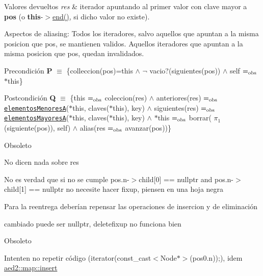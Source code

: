 \begin{DoxyRetVals}{Valores devueltos}
{\em res} & iterador apuntando al primer valor con clave mayor a {\bfseries pos} (o {\bfseries this}-\/$>$\hyperlink{classaed2_1_1map_a76023e6a56cb625513e1b5ea028bf983_a76023e6a56cb625513e1b5ea028bf983}{end()}, si dicho valor no existe).\\
\hline
\end{DoxyRetVals}
\begin{DoxyParagraph}{Aspectos de aliasing\+:}
Todos los iteradores, salvo aquellos que apuntan a la misma posicion que pos, se mantienen validos. Aquellos iteradores que apuntan a la misma posicion que pos, quedan invalidados.
\end{DoxyParagraph}
\begin{DoxyPrecond}{Precondición}
{\bfseries P} $\equiv$ \{colleccion(pos)=this $\land$ $\lnot$ vacio?(siguientes(pos)) $\land$ self $=_{\rm obs}$ $\ast$this\} 
\end{DoxyPrecond}
\begin{DoxyPostcond}{Postcondición}
{\bfseries Q} $\equiv$ \{this $=_{\rm obs}$ coleccion(res) $\land$ anteriores(res) $=_{\rm obs}$ \href{axiomas.html#elementosMenoresA}{\tt elementos\+MenoresA}($\ast$this, claves($\ast$this), key) $\land$ siguientes(res) $=_{\rm obs}$ \href{axiomas.html#elementosMayoresA}{\tt elementos\+MayoresA}($\ast$this, claves($\ast$this), key) $\land$ $\ast$this $=_{\rm obs}$ borrar( $\pi_1$(siguiente(pos)), self) $\land$ alias(res $=_{\rm obs}$ avanzar(pos))\}
\end{DoxyPostcond}
\begin{DoxyRefDesc}{Obsoleto}
\item[\hyperlink{deprecated__deprecated000016}{Obsoleto}]No dicen nada sobre res 

No es verdad que si no se cumple pos.\+n-\/$>$child\mbox{[}0\mbox{]} == nullptr and pos.\+n-\/$>$child\mbox{[}1\mbox{]} == nullptr no necesite hacer fixup, piensen en una hoja negra 

Para la reentrega deberían repensar las operaciones de insercion y de eliminación 

cambiado puede ser nullptr, deletefixup no funciona bien\end{DoxyRefDesc}


\begin{DoxyRefDesc}{Obsoleto}
\item[\hyperlink{deprecated__deprecated000017}{Obsoleto}]Intenten no repetir código (iterator(const\+\_\+cast$<$\+Node$\ast$$>$(pos0.\+n));), idem \hyperlink{classaed2_1_1map_a6941cde9a79c27f054b5c97a587a1854_a6941cde9a79c27f054b5c97a587a1854}{aed2\+::map\+::insert} \end{DoxyRefDesc}



